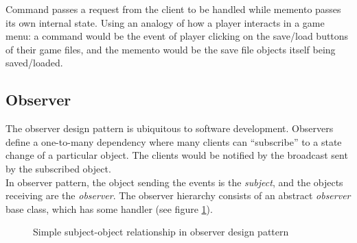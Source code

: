 \begin{multicols}{2}
Command passes a request from the client to be handled while memento passes its own internal state. Using an analogy of how a player interacts in a game menu: a command would be the event of player clicking on the save/load buttons of their game files, and the memento would be the save file objects itself being saved/loaded.\bs
\\

\subsection{Observer}

The observer design pattern is ubiquitous to software development. Observers define a one-to-many dependency where many clients can ``subscribe'' to a state change of a particular object. The clients would be notified by the broadcast sent by the subscribed object.\bs
\\
In observer pattern, the object sending the events is the \textit{subject}, and the objects receiving are the \textit{observer}. The observer hierarchy consists of an abstract \textit{observer} base class, which has some handler (see figure \ref{fig:observer-simple}).

\begin{figure}[H]
	\centering


	\caption{Simple subject-object relationship in observer design pattern}
	\label{fig:observer-simple}
\end{figure}


\end{multicols}
